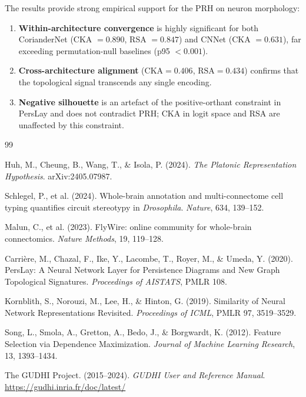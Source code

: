 The results provide strong empirical support for the PRH on neuron morphology:
\begin{enumerate}
  \item \textbf{Within-architecture convergence} is highly significant for both
        CorianderNet (CKA $= 0.890$, RSA $= 0.847$) and CNNet (CKA $= 0.631$),
        far exceeding permutation-null baselines (p95 $< 0.001$).
  \item \textbf{Cross-architecture alignment} ($\text{CKA} = 0.406$,
        $\text{RSA} = 0.434$) confirms that the topological signal transcends
        any single encoding.
  \item \textbf{Negative silhouette} is an artefact of the positive-orthant
        constraint in PersLay and does not contradict PRH; CKA in logit space
        and RSA are unaffected by this constraint.
\end{enumerate}


\begin{thebibliography}{99}

Huh, M., Cheung, B., Wang, T., \& Isola, P. (2024).
\textit{The Platonic Representation Hypothesis}.
arXiv:2405.07987.

Schlegel, P., et al. (2024).
Whole-brain annotation and multi-connectome cell typing quantifies circuit stereotypy in \textit{Drosophila}.
\textit{Nature}, 634, 139--152.

Malun, C., et al. (2023).
FlyWire: online community for whole-brain connectomics.
\textit{Nature Methods}, 19, 119--128.

Carri\`ere, M., Chazal, F., Ike, Y., Lacombe, T., Royer, M., \& Umeda, Y. (2020).
PersLay: A Neural Network Layer for Persistence Diagrams and New Graph Topological Signatures.
\textit{Proceedings of AISTATS}, PMLR 108.

Kornblith, S., Norouzi, M., Lee, H., \& Hinton, G. (2019).
Similarity of Neural Network Representations Revisited.
\textit{Proceedings of ICML}, PMLR 97, 3519--3529.

Song, L., Smola, A., Gretton, A., Bedo, J., \& Borgwardt, K. (2012).
Feature Selection via Dependence Maximization.
\textit{Journal of Machine Learning Research}, 13, 1393--1434.

The GUDHI Project. (2015--2024).
\textit{GUDHI User and Reference Manual}.
\url{https://gudhi.inria.fr/doc/latest/}

\end{thebibliography}

